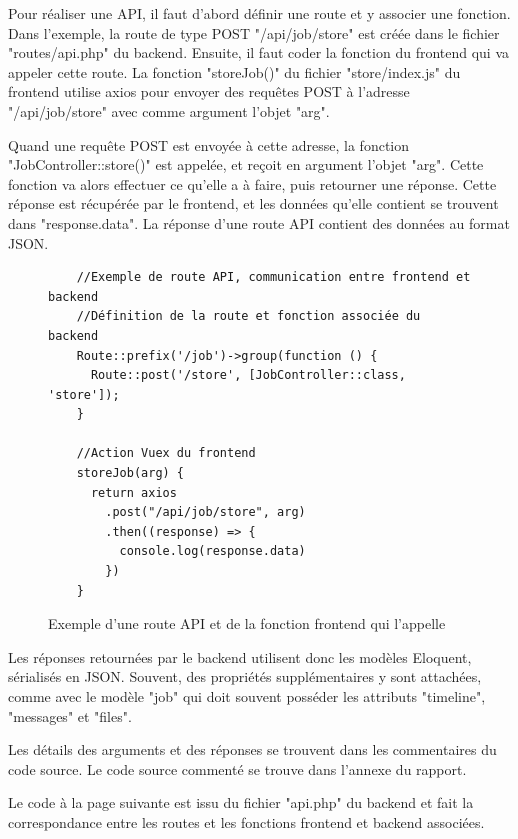 \documentclass[
    iai, %
    eai, %
]{heig-tb}
\begin{document}
Pour réaliser une API, il faut d'abord définir une route et y associer une fonction. Dans l'exemple, la route de type POST "/api/job/store" est créée dans le fichier "routes/api.php" du backend.
Ensuite, il faut coder la fonction du frontend qui va appeler cette route. La fonction "storeJob()" du fichier "store/index.js" du frontend utilise axios pour envoyer des requêtes POST à l'adresse "/api/job/store" avec comme argument l'objet "arg".

Quand une requête POST est envoyée à cette adresse, la fonction "JobController::store()" est appelée, et reçoit en argument l'objet "arg". Cette fonction va alors effectuer ce qu'elle a à faire, puis retourner une réponse. Cette réponse est récupérée par le frontend, et les données qu'elle contient se trouvent dans "response.data". La réponse d'une route API contient des données au format JSON.

\begin{figure}[h]
  \begin{verbatim}
    //Exemple de route API, communication entre frontend et backend
    //Définition de la route et fonction associée du backend
    Route::prefix('/job')->group(function () {
      Route::post('/store', [JobController::class, 'store']);
    }

    //Action Vuex du frontend
    storeJob(arg) {
      return axios
        .post("/api/job/store", arg)
        .then((response) => {
          console.log(response.data)
        })
    }
  \end{verbatim}
  \caption{Exemple d'une route API et de la fonction frontend qui l'appelle}
\end{figure}

Les réponses retournées par le backend utilisent donc les modèles Eloquent, sérialisés en JSON. Souvent, des propriétés supplémentaires y sont attachées, comme avec le modèle "job" qui doit souvent posséder les attributs "timeline", "messages" et "files".

Les détails des arguments et des réponses se trouvent dans les commentaires du code source. Le code source commenté se trouve dans l'annexe du rapport.

Le code à la page suivante est issu du fichier "api.php" du backend et fait la correspondance entre les routes et les fonctions frontend et backend associées.
\end{document}
